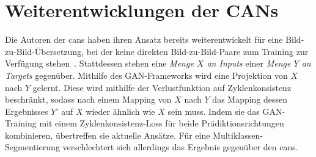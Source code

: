 \section{Weiterentwicklungen der CANs}

Die Autoren der \glspl{can} haben ihren Ansatz bereits weiterentwickelt für eine Bild-zu-Bild-Übersetzung, bei der keine direkten Bild-zu-Bild-Paare zum Training zur Verfügung stehen~\cite{Zhu.2018}.
Stattdessen stehen eine \emph{Menge $ X $ an Inputs} einer \emph{Menge $ Y $ an Targets} gegenüber.
Mithilfe des GAN-Frameworks wird eine Projektion von $ X $ nach $ Y $ gelernt.
Diese wird mithilfe der Verlustfunktion auf Zyklenkonsistenz beschränkt, sodass nach einem Mapping von $ X $ nach $ Y $ das Mapping dessen Ergebnisses $ Y' $ auf $ X $ wieder ähnlich wie $ X $ sein muss.
Indem sie das GAN-Training mit einem Zyklenkonsistenz-Loss für beide Prädiktionsrichtungen kombinieren, übertreffen sie aktuelle Ansätze.
Für eine Multiklassen-Segmentierung verschlechtert sich allerdings das Ergebnis gegenüber den \glspl{can}.
